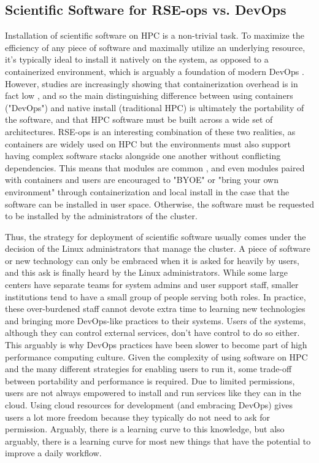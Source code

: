 \subsection{Scientific Software for RSE-ops vs. DevOps}

Installation of scientific software on HPC is a non-trivial task. To maximize the efficiency of any piece of software and maximally utilize an underlying resource, it's typically ideal to install it natively on the system, as opposed to a containerized environment, which is arguably a foundation of modern DevOps \cite{containers-intro}. However, studies are increasingly showing that containerization overhead is in fact low \cite{Torrez2019-ho}, and so the main distinguishing difference between using containers ("DevOps") and native install (traditional HPC) is ultimately the portability of the software, and that HPC software must be built across a wide set of architectures. RSE-ops is an interesting combination of these two realities, as containers are widely used on HPC \cite{singularity,charlie,podman} but the environments must also support having complex software stacks alongside one another without conflicting dependencies. This means that modules are common \cite{LMOD,environment-modules}, and even modules paired with containers \cite{shpc} and users are encouraged to "BYOE" or "bring your own environment" through containerization and local install in the case that the software can be installed in user space. Otherwise, the software must be requested to be installed by the administrators of the cluster.

Thus, the strategy for deployment of scientific software usually comes under the decision of the Linux administrators that manage the cluster. A piece of software or new technology can only be embraced when it is asked for heavily by users, and this ask is finally heard by the Linux administrators. While some large centers have separate teams for system admins and user support staff, smaller institutions tend to have a small group of people serving both roles. In practice, these over-burdened staff cannot devote extra time to learning new technologies and bringing more DevOps-like practices to their systems. Users of the systems, although they can control external services, don't have control to do so either. This arguably is why DevOps practices have been slower to become part of high performance computing culture. Given the complexity of using software on HPC and the many different strategies for enabling users to run it, some trade-off between portability and performance is required. Due to limited permissions, users are not always empowered to install and run services like they can in the cloud. Using cloud resources for development (and embracing DevOps) gives users a lot more freedom because they typically do not need to ask for permission. Arguably, there is a learning curve to this knowledge, but also arguably, there is a learning curve for most new things that have the potential to improve a daily workflow.

